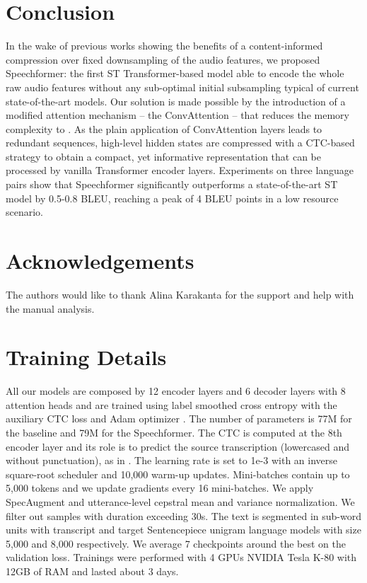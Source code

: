 \documentclass[11pt]{article}
\begin{document}
\section{Conclusion}
In the wake of previous works showing the benefits of a content-informed compression over fixed downsampling of the audio features, we proposed Speechformer: the first ST Transformer-based model able to encode the whole raw audio features without any sub-optimal initial subsampling typical of current state-of-the-art models.
Our solution is made possible by the introduction of a modified attention mechanism -- the ConvAttention -- that reduces the memory complexity to .
As the plain application of ConvAttention layers leads to redundant sequences, high-level hidden states are compressed with a CTC-based strategy to obtain a compact, yet informative representation that can be processed by vanilla Transformer encoder layers.
Experiments on three language pairs show that Speechformer significantly outperforms a state-of-the-art ST model by 0.5-0.8 BLEU, reaching a peak of 4 BLEU points in a low resource scenario.

\section*{Acknowledgements}

The authors would like to thank Alina Karakanta for the support and help with the manual analysis.





\appendix

\section{Training Details}
\label{sec:training}

All our models are composed by 12 encoder layers and 6 decoder layers with 8 attention heads and are trained using label smoothed cross entropy \cite{szegedy2016rethinking} with the auxiliary CTC loss \cite{kim-et-al-2017-joint,bahar2019comparative} and Adam optimizer \cite{DBLP:journals/corr/KingmaB14}.
The number of parameters is 77M for the baseline and 79M for the Speechformer.
The CTC is computed at the 8th encoder layer and its role is to predict the source transcription (lowercased and without punctuation), as in \cite{liu2020bridging}. 
The learning rate is set to 1e-3 with an inverse square-root scheduler and 10,000 warm-up updates.
Mini-batches contain up to 5,000 tokens and we update gradients every 16 mini-batches.
We apply SpecAugment \cite{Park_2019} and utterance-level cepstral mean and variance normalization. We filter out samples with duration exceeding 30s. The text is segmented in sub-word units with transcript and target Sentencepiece \cite{kudo-richardson-2018-sentencepiece} unigram language models \cite{kudo-2018-subword} with size 5,000 and 8,000 respectively.
We average 7 checkpoints around the best on the validation loss. Trainings were performed with 4 GPUs NVIDIA Tesla K-80 with 12GB of RAM and lasted about 3 days.
\end{document}
